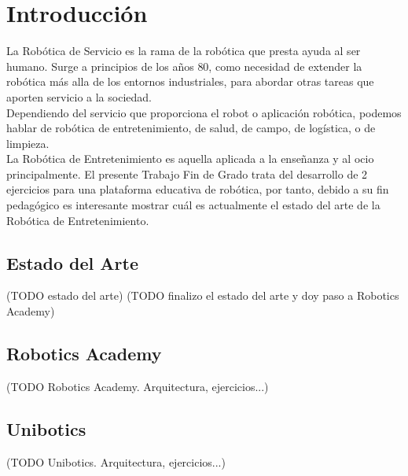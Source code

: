 \chapter{Introducción}
\label{cap:capitulo1}
\setcounter{page}{1}

La Robótica de Servicio es la rama de la robótica que presta ayuda al ser humano. Surge a principios de los años 80, como necesidad de extender la robótica más alla de los entornos industriales, para abordar otras tareas que aporten servicio a la sociedad.\\

Dependiendo del servicio que proporciona el robot o aplicación robótica, podemos hablar de robótica de entretenimiento, de salud, de campo, de logística, o de limpieza.\\

La Robótica de Entretenimiento es aquella aplicada a la enseñanza y al ocio principalmente. El presente Trabajo Fin de Grado trata del desarrollo de 2 ejercicios para una plataforma educativa de robótica, por tanto, debido a su fin pedagógico es interesante mostrar cuál es actualmente el estado del arte de la Robótica de Entretenimiento.

\section{Estado del Arte}
\label{sec:estado_arte}

(TODO estado del arte)
(TODO finalizo el estado del arte y doy paso a Robotics Academy)

\section{Robotics Academy}
\label{sec:robotics_academy}

(TODO Robotics Academy. Arquitectura, ejercicios...)

\section{Unibotics}
\label{sec:unibotics}

(TODO Unibotics. Arquitectura, ejercicios...)
